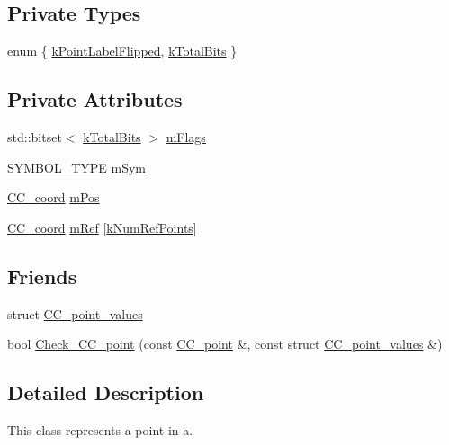 \subsection*{Private Types}
\begin{DoxyCompactItemize}
\item 
enum \{ \hyperlink{a00034_aa09d4a78d659a5809cc4ca1e7022c84aac11f0df078c0ced8c4de839952fbe1e8}{k\-Point\-Label\-Flipped}, 
\hyperlink{a00034_aa09d4a78d659a5809cc4ca1e7022c84aac65d0716d4049256924dd894d9935221}{k\-Total\-Bits}
 \}
\end{DoxyCompactItemize}
\subsection*{Private Attributes}
\begin{DoxyCompactItemize}
\item 
std\-::bitset$<$ \hyperlink{a00034_aa09d4a78d659a5809cc4ca1e7022c84aac65d0716d4049256924dd894d9935221}{k\-Total\-Bits} $>$ \hyperlink{a00034_a676172a1cc4a700a9c3662155c8b06a8}{m\-Flags}
\item 
\hyperlink{a00216_a68cd84e0300be6f9ff4474682762c9ee}{S\-Y\-M\-B\-O\-L\-\_\-\-T\-Y\-P\-E} \hyperlink{a00034_a43c6a5906d61451a1bc48635faf44721}{m\-Sym}
\item 
\hyperlink{a00029}{C\-C\-\_\-coord} \hyperlink{a00034_a01cdfaad90c4b25418c94e3e17e119a1}{m\-Pos}
\item 
\hyperlink{a00029}{C\-C\-\_\-coord} \hyperlink{a00034_acb88e94b06850fed4fb44fa9fe095fc0}{m\-Ref} \mbox{[}\hyperlink{a00034_a2b34de427e5864328fd455f3122d96f4}{k\-Num\-Ref\-Points}\mbox{]}
\end{DoxyCompactItemize}
\subsection*{Friends}
\begin{DoxyCompactItemize}
\item 
struct \hyperlink{a00034_ab0f18edc2251918b5602d8a471f2ecc0}{C\-C\-\_\-point\-\_\-values}
\item 
bool \hyperlink{a00034_a83253bab8cb644ce0049e6bc659c22c5}{Check\-\_\-\-C\-C\-\_\-point} (const \hyperlink{a00034}{C\-C\-\_\-point} \&, const struct \hyperlink{a00035}{C\-C\-\_\-point\-\_\-values} \&)
\end{DoxyCompactItemize}


\subsection{Detailed Description}
This class represents a point in a. 

